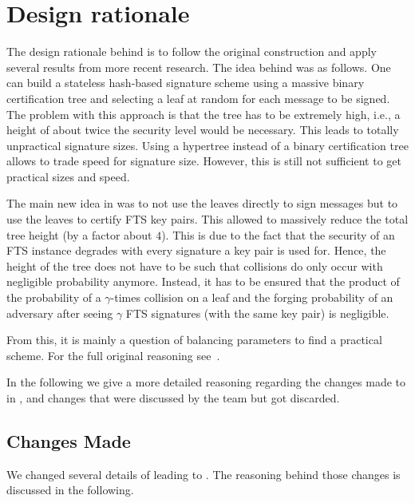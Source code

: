 \section{Design rationale}

The design rationale behind \spx is to follow the original \spc construction 
and apply several results from more recent research. The idea behind \spc was 
as follows. One can build a 
stateless hash-based signature scheme using a massive binary 
certification tree and selecting a leaf at random 
for each message to be signed. The problem with this approach is that the 
tree has to be extremely high, i.e., a height of about twice the security level
would be necessary. This leads to totally unpractical signature sizes. Using a
hypertree instead of a binary certification tree allows to trade speed for 
signature size. However, this is still not sufficient to get practical sizes
and speed. 

The main new idea in \spc was to not use the leaves directly to 
sign messages but to use the leaves to certify FTS key pairs. This allowed to 
massively reduce the total tree height (by a factor about $4$). This is due to 
the fact that the security of an FTS instance degrades with every signature 
a key pair is used for. Hence, the height of the tree does not have to be such 
that collisions do only occur with negligible probability anymore. Instead, 
it has to be ensured that the product of the probability of a $\gamma$-times 
collision on a leaf and the forging probability of an adversary after seeing 
$\gamma$ FTS signatures (with the same key pair) is negligible.

From this, it is mainly a question of balancing parameters to find a practical 
scheme. For the full original reasoning see~\cite{Bernstein2015}.

In the following we give a more detailed reasoning regarding the changes 
made to \spc in \spx, %
and changes that were 
discussed by the \spx team but got discarded.

\subsection{Changes Made}
We changed several details of \spc leading to \spx. The reasoning behind those 
changes is discussed in the following.

